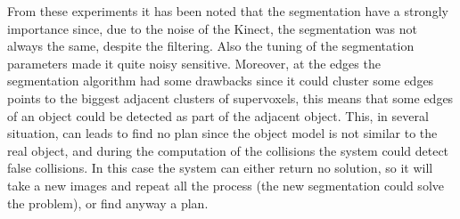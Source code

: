 From these experiments it has been noted that the segmentation have a strongly importance since, due to the noise of the Kinect, the segmentation was not always the same, despite the filtering. Also the tuning of the segmentation parameters made it quite noisy sensitive. Moreover, at the edges the segmentation algorithm had some drawbacks since it could cluster some edges points to the biggest adjacent clusters of supervoxels, this means that some edges of an object could be detected as part of the adjacent object. This, in several situation, can leads to find no plan since the object model is not similar to the real object, and during the computation of the collisions the system could detect false collisions. In this case the system can either return no solution, so it will take a new images and repeat all the process (the new segmentation could solve the problem), or find anyway a plan.  




